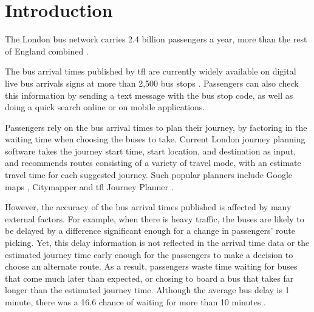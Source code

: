\chapter{Introduction}

The London bus network carries 2.4 billion passengers a year, more than the rest of England combined \cite{tfl_annual_report_13/14}.

\par The bus arrival times published by \acrfull{tfl} are currently widely available on digital live bus arrivals signs at more than 2,500 bus stops \cite{live_bus_arrivals}. Passengers can also check this information by sending a text message with the bus stop code, as well as doing a quick search online or on mobile applications.



\par Passengers rely on the bus arrival times to plan their journey, by factoring in the waiting time when choosing the buses to take. Current London journey planning software takes the journey start time, start location, and destination as input, and recommends routes consisting of a variety of travel mode, with an estimate travel time for each suggested journey. Such popular planners include Google maps \cite{google_maps}, Citymapper \cite{citymapper} and \acrshort{tfl} Journey Planner \cite{tfl_journey_planner}.

\par However, the accuracy of the bus arrival times published is affected by many external factors. For example, when there is heavy traffic, the buses are likely to be delayed by a difference significant enough for a change in passengers' route picking. Yet, this delay information is not reflected in the arrival time data or the estimated journey time early enough for the passengers to make a decision to choose an alternate route. As a result, passengers waste time waiting for buses that come much later than expected, or chosing to board a bus that takes far longer than the estimated journey time. Although the average bus delay is 1 minute, there was a 16.6 chance of waiting for more than 10 minutes \cite{buses_performance_data}.

